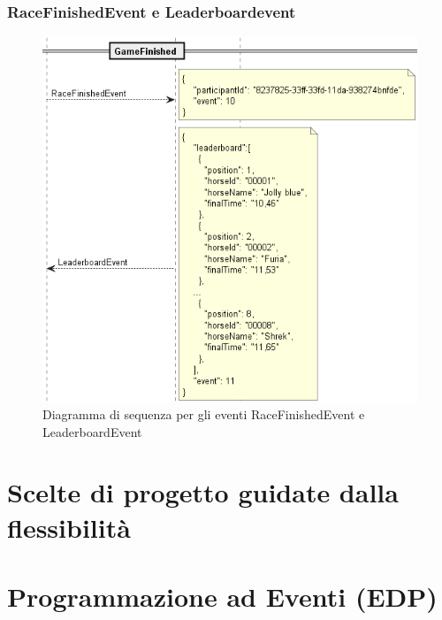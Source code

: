         \subsubsection{RaceFinishedEvent e Leaderboardevent}

        \begin{figure}[!ht]
            \centering
            \includegraphics[width=12cm]{figure/RaceFinishedEvent.png}
            \caption{Diagramma di sequenza per gli eventi RaceFinishedEvent e LeaderboardEvent}
        \end{figure}


\section{Scelte di progetto guidate dalla flessibilità}

\section{Programmazione ad Eventi (EDP)}



